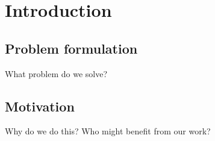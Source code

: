\section{Introduction}

\subsection{Problem formulation}
What problem do we solve?


\subsection{Motivation}
Why do we do this?
Who might benefit from our work?
